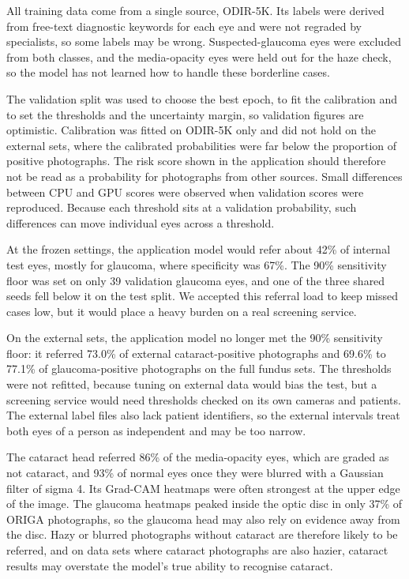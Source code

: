 \documentclass[conference,a4paper]{IEEEtran}
\begin{document}
All training data come from a single source, ODIR-5K. Its labels were derived from free-text
diagnostic keywords for each eye and were not regraded by specialists, so some labels may be wrong.
Suspected-glaucoma eyes were excluded from both classes, and the media-opacity eyes were held out
for the haze check, so the model has not learned how to handle these borderline cases.

The validation split was used to choose the best epoch, to fit the calibration and to set the
thresholds and the uncertainty margin, so validation figures are optimistic. Calibration was fitted
on ODIR-5K only and did not hold on the external sets, where the calibrated probabilities were far
below the proportion of positive photographs. The risk score shown in the application should
therefore not be read as a probability for photographs from other sources. Small differences between
CPU and GPU scores were observed when validation scores were reproduced. Because each threshold sits
at a validation probability, such differences can move individual eyes across a threshold.

At the frozen settings, the application model would refer about 42\% of internal test eyes, mostly
for glaucoma, where specificity was 67\%. The 90\% sensitivity floor was set on only 39 validation
glaucoma eyes, and one of the three shared seeds fell below it on the test split. We accepted this
referral load to keep missed cases low, but it would place a heavy burden on a real screening
service.

On the external sets, the application model no longer met the 90\% sensitivity floor: it referred
73.0\% of external cataract-positive photographs and 69.6\% to 77.1\% of glaucoma-positive
photographs on the full fundus sets. The thresholds were not refitted, because tuning on external
data would bias the test, but a screening service would need thresholds checked on its own cameras
and patients. The external label files also lack patient identifiers, so the external intervals
treat both eyes of a person as independent and may be too narrow.

The cataract head referred 86\% of the media-opacity eyes, which are graded as not cataract, and
93\% of normal eyes once they were blurred with a Gaussian filter of sigma 4. Its Grad-CAM heatmaps
were often strongest at the upper edge of the image. The glaucoma heatmaps peaked inside the optic
disc in only 37\% of ORIGA photographs, so the glaucoma head may also rely on evidence away from the
disc. Hazy or blurred photographs without cataract are therefore likely to be referred, and on data
sets where cataract photographs are also hazier, cataract results may overstate the model's true
ability to recognise cataract.
\end{document}
